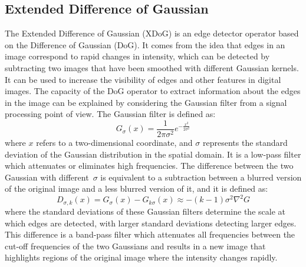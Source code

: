 \subsection{Extended Difference of Gaussian}
The Extended Difference of Gaussian (XDoG) is an edge detector operator based on the Difference of Gaussian (DoG). It comes from the idea that edges in an image correspond to rapid changes in intensity, which can be detected by subtracting two images that have been smoothed with different Gaussian kernels. It can be used to increase the visibility of edges and other features in digital images.
The capacity of the DoG operator to extract information about the edges in the image can be explained by considering the Gaussian filter from a signal processing point of view. The Gaussian filter is defined as: 
\begin{equation}
    G_{\sigma}(x)=\frac{1}{2\pi \sigma^2}e^{-\frac{x^2}{2\sigma^2}}
\end{equation}
where $x$ refers to a two-dimensional coordinate, and $\sigma$ represents the standard deviation of the Gaussian distribution in the spatial domain. It is a low-pass filter which attenuates or eliminates high frequencies. The difference between the two Gaussian with different $\sigma$ is equivalent to a subtraction between a blurred version of the original image and a less blurred version of it, and it is defined as: 
 \begin{equation}
     D_{\sigma, k}(x)=G_{\sigma}(x)-G_{k\sigma}(x) \approx -(k-1)\sigma^2 \nabla ^2 G
 \end{equation}
where the standard deviations of these Gaussian filters determine the scale at which edges are detected, with larger standard deviations detecting larger edges.
This difference is a band-pass filter which attenuates all frequencies between the cut-off frequencies of the two Gaussians and results in a new image that highlights regions of the original image where the intensity changes rapidly.

